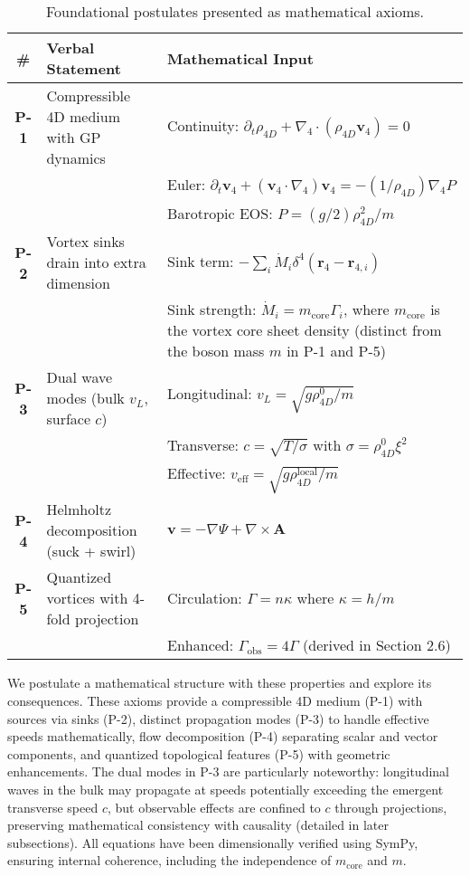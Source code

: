 \begin{table}[H]
\centering
\begin{tabularx}{\textwidth}{|c|Y|Y|}
\hline
\# & Verbal Statement & Mathematical Input \\
\hline
\textbf{P-1} & Compressible 4D medium with GP dynamics & Continuity: $\partial_t \rho_{4D} + \nabla_4 \cdot (\rho_{4D} \mathbf{v}_4) = 0$ \\
& & Euler: $\partial_t \mathbf{v}_4 + (\mathbf{v}_4 \cdot \nabla_4) \mathbf{v}_4 = -(1/\rho_{4D}) \nabla_4 P$ \\
& & Barotropic EOS: $P = (g/2) \rho_{4D}^2 / m$ \\
\hline
\textbf{P-2} & Vortex sinks drain into extra dimension & Sink term: $-\sum_i \dot{M}_i \delta^4(\mathbf{r}_4 - \mathbf{r}_{4,i})$ \\
& & Sink strength: $\dot{M}_i = m_{\text{core}} \Gamma_i$, where $m_{\text{core}}$ is the vortex core sheet density (distinct from the boson mass $m$ in P-1 and P-5) \\
\hline
\textbf{P-3} & Dual wave modes (bulk $v_L$, surface $c$) & Longitudinal: $v_L = \sqrt{g \rho_{4D}^0 / m}$ \\
& & Transverse: $c = \sqrt{T / \sigma}$ with $\sigma = \rho_{4D}^0 \xi^2$ \\
& & Effective: $v_{\text{eff}} = \sqrt{g \rho_{4D}^{\text{local}} / m}$ \\
\hline
\textbf{P-4} & Helmholtz decomposition (suck + swirl) & $\mathbf{v} = -\nabla \Psi + \nabla \times \mathbf{A}$ \\
\hline
\textbf{P-5} & Quantized vortices with 4-fold projection & Circulation: $\Gamma = n \kappa$ where $\kappa = h / m$ \\
& & Enhanced: $\Gamma_{\text{obs}} = 4 \Gamma$ (derived in Section 2.6) \\
\hline
\end{tabularx}
\caption{Foundational postulates presented as mathematical axioms.}
\label{tab:postulates}
\end{table}

We postulate a mathematical structure with these properties and explore its consequences. These axioms provide a compressible 4D medium (P-1) with sources via sinks (P-2), distinct propagation modes (P-3) to handle effective speeds mathematically, flow decomposition (P-4) separating scalar and vector components, and quantized topological features (P-5) with geometric enhancements. The dual modes in P-3 are particularly noteworthy: longitudinal waves in the bulk may propagate at speeds potentially exceeding the emergent transverse speed $c$, but observable effects are confined to $c$ through projections, preserving mathematical consistency with causality (detailed in later subsections). All equations have been dimensionally verified using SymPy, ensuring internal coherence, including the independence of $m_{\text{core}}$ and $m$.

